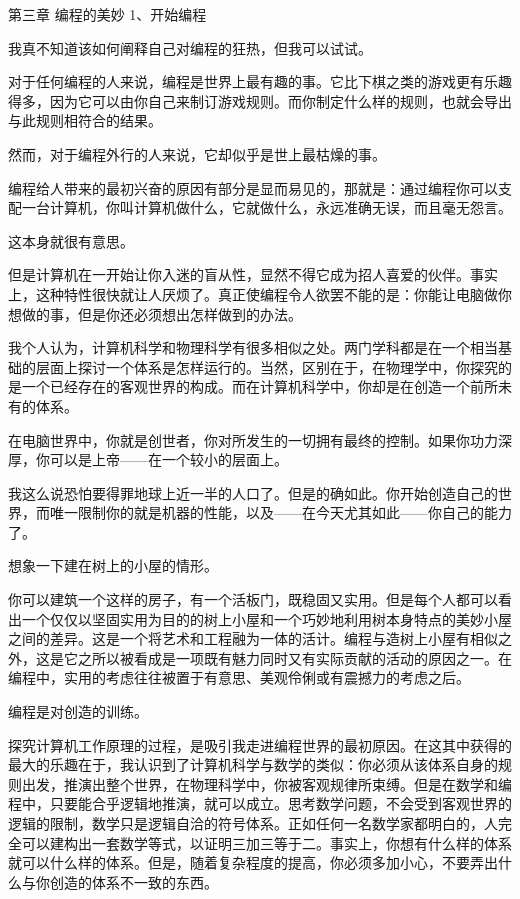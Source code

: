 第三章 编程的美妙
1、开始编程

我真不知道该如何阐释自己对编程的狂热，但我可以试试。

对于任何编程的人来说，编程是世界上最有趣的事。它比下棋之类的游戏更有乐趣得多，因为它可以由你自己来制订游戏规则。而你制定什么样的规则，也就会导出与此规则相符合的结果。

然而，对于编程外行的人来说，它却似乎是世上最枯燥的事。

编程给人带来的最初兴奋的原因有部分是显而易见的，那就是：通过编程你可以支配一台计算机，你叫计算机做什么，它就做什么，永远准确无误，而且毫无怨言。

这本身就很有意思。

但是计算机在一开始让你入迷的盲从性，显然不得它成为招人喜爱的伙伴。事实上，这种特性很快就让人厌烦了。真正使编程令人欲罢不能的是：你能让电脑做你想做的事，但是你还必须想出怎样做到的办法。

我个人认为，计算机科学和物理科学有很多相似之处。两门学科都是在一个相当基础的层面上探讨一个体系是怎样运行的。当然，区别在于，在物理学中，你探究的是一个已经存在的客观世界的构成。而在计算机科学中，你却是在创造一个前所未有的体系。

在电脑世界中，你就是创世者，你对所发生的一切拥有最终的控制。如果你功力深厚，你可以是上帝——在一个较小的层面上。

我这么说恐怕要得罪地球上近一半的人口了。但是的确如此。你开始创造自己的世界，而唯一限制你的就是机器的性能，以及——在今天尤其如此——你自己的能力了。

 

想象一下建在树上的小屋的情形。

你可以建筑一个这样的房子，有一个活板门，既稳固又实用。但是每个人都可以看出一个仅仅以坚固实用为目的的树上小屋和一个巧妙地利用树本身特点的美妙小屋之间的差异。这是一个将艺术和工程融为一体的活计。编程与造树上小屋有相似之外，这是它之所以被看成是一项既有魅力同时又有实际贡献的活动的原因之一。在编程中，实用的考虑往往被置于有意思、美观伶俐或有震撼力的考虑之后。

编程是对创造的训练。

探究计算机工作原理的过程，是吸引我走进编程世界的最初原因。在这其中获得的最大的乐趣在于，我认识到了计算机科学与数学的类似：你必须从该体系自身的规则出发，推演出整个世界，在物理科学中，你被客观规律所束缚。但是在数学和编程中，只要能合乎逻辑地推演，就可以成立。思考数学问题，不会受到客观世界的逻辑的限制，数学只是逻辑自洽的符号体系。正如任何一名数学家都明白的，人完全可以建构出一套数学等式，以证明三加三等于二。事实上，你想有什么样的体系就可以什么样的体系。但是，随着复杂程度的提高，你必须多加小心，不要弄出什么与你创造的体系不一致的东西。

